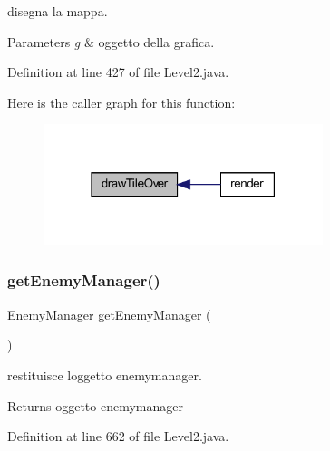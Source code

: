 disegna la mappa. 


\begin{DoxyParams}{Parameters}
{\em g} & oggetto della grafica. \\
\hline
\end{DoxyParams}


Definition at line 427 of file Level2.\+java.

Here is the caller graph for this function\+:\nopagebreak
\begin{figure}[H]
\begin{center}
\leavevmode
\includegraphics[width=231pt]{classscenes_1_1_level2_ac299bbbbb70f97ae032c1345d5937378_icgraph}
\end{center}
\end{figure}
\mbox{\label{classscenes_1_1_level2_afdfe86992bb21f6ad2d9aea028b7896a}} 
\subsubsection{\texorpdfstring{get\+Enemy\+Manager()}{getEnemyManager()}}
{\footnotesize\ttfamily \hyperlink{classmanagers_1_1_enemy_manager}{Enemy\+Manager} get\+Enemy\+Manager (\begin{DoxyParamCaption}{ }\end{DoxyParamCaption})}



restituisce l\textquotesingle{}oggetto enemymanager. 

\begin{DoxyReturn}{Returns}
oggetto enemymanager 
\end{DoxyReturn}


Definition at line 662 of file Level2.\+java.

\mbox{\label{classscenes_1_1_level2_af5e9f906de91e4d6400bb7f27cd563f3}} 
